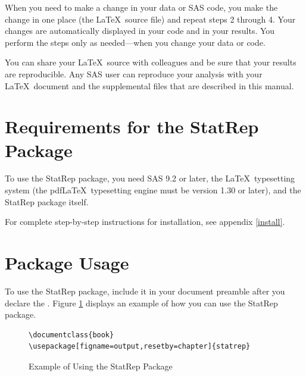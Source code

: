 \documentclass[article,oneside]{memoir}
\newcommand*{\StatRep}{\textsf{StatRep}\xspace}
\begin{document}
When you need to make a change in your data or SAS code, you make the change in
one place (the \LaTeX\ source file) and repeat steps 2 through 4.
Your changes are automatically displayed in your code and in your results.
You perform the steps only as needed---when you change your data or code.

You can share your \LaTeX\ source with colleagues and be sure that your results
are reproducible. Any SAS user can reproduce your analysis with your \LaTeX\ document
and the supplemental files that are described in this manual.

\section{Requirements for the \StatRep Package}
To use the \StatRep package, you need SAS 9.2 or later,
the \LaTeX\ typesetting system
(the  pdf\LaTeX\ typesetting engine must be version 1.30 or later), and the \StatRep package itself.

For complete step-by-step instructions for installation, see appendix \ref{install}.

\section{Package Usage}
  To use the \StatRep package, include it in your document preamble after you
  declare the .
  Figure \ref{fig:usage} displays an example of how you can use the \StatRep package.

\begin{figure}[H]
\begin{shaded}
\begin{verbatim}
\documentclass{book}
\usepackage[figname=output,resetby=chapter]{statrep}
\end{verbatim}%
\end{shaded}
\caption{Example of Using the \StatRep Package}\label{fig:usage}
\end{figure}
\end{document}

